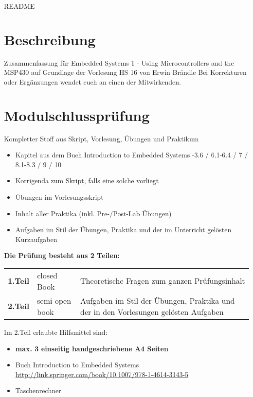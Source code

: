 \thispagestyle{empty}
\setcounter{page}{0} %
\vspace*{-2cm}
{\huge README }
{\scriptsize
\section*{Beschreibung}
Zusammenfassung für Embedded Systems 1 - Using Microcontrollers and the MSP430 auf Grundlage der Vorlesung HS 16 von Erwin Brändle  \newline
Bei Korrekturen oder Ergänzungen wendet euch an einen der Mitwirkenden.


\section*{Modulschlussprüfung}
Kompletter Stoff aus Skript, Vorlesung, Übungen und Praktikum

    \begin{itemize}
        \item Kapitel aus dem Buch Introduction to Embedded Systems 
	        -3.6 / 6.1-6.4 / 7 / 8.1-8.3 / 9 / 10 
	     \item Korrigenda zum Skript, falls eine solche vorliegt  
	     \item Übungen im Vorlesungsskript  
	     \item Inhalt aller Praktika (inkl. Pre-/Post-Lab Übungen)
	     \item Aufgaben im Stil der Übungen, Praktika und der im Unterricht gelösten Kurzaufgaben
    \end{itemize}

\textbf{Die Prüfung besteht aus 2 Teilen:}\newline
\begin{tabular}{p{1.5cm} p{3cm} p{10cm}}
    \textbf{ 1.Teil}   & closed Book & Theoretische Fragen zum ganzen Prüfungsinhalt \\ 
    \textbf{ 2.Teil}   & semi-open book & Aufgaben im Stil der Übungen, Praktika und der in den Vorlesungen gelösten Aufgaben \\ 
\end{tabular} \newline

Im 2.Teil erlaubte Hilfsmittel sind:
\begin{itemize}
	\item \textbf{max. 3 einseitig handgeschriebene A4 Seiten}
	\item Buch Introduction to Embedded Systems
    \subitem \url{http://link.springer.com/book/10.1007/978-1-4614-3143-5}
	\item Taschenrechner
\end{itemize}

}
